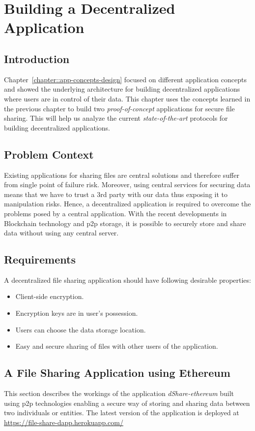 \chapter{Building a Decentralized Application}\label{chapter:building-dapp}

	\section{Introduction}
	Chapter~\ref{chapter::app-concepts-design} focused on different application concepts and showed the underlying architecture for building decentralized applications where users are in control of their data. This chapter uses the concepts learned in the previous chapter to build two \textit{proof-of-concept} applications for secure file sharing. This will help us analyze the current \textit{state-of-the-art} protocols for building decentralized applications.
	
	\section{Problem Context}
	Existing applications for sharing files are central solutions and therefore suffer from single point of failure risk. Moreover, using central services for securing data means that we have to trust a 3rd party with our data thus exposing it to manipulation risks. Hence, a decentralized application is required to overcome the problems posed by a central application. With the recent developments in Blockchain technology and p2p storage, it is possible to securely store and share data without using any central server.
	
	\section{Requirements}\label{sec:requirements}
	A decentralized file sharing application should have following desirable properties:
	\begin{itemize}
		\item Client-side encryption.
		\item Encryption keys are in user's possession.
		\item Users can choose the data storage location.
		\item Easy and secure sharing of files with other users of the application.
	\end{itemize}

	\section{A File Sharing Application using Ethereum}
	This section describes the workings of the application \textit{dShare-ethereum}\cite{harsh_kedia_2019_3359852} built using p2p technologies enabling a secure way of storing and sharing data between two individuals or entities. The latest version of the application is deployed at \url{https://file-share-dapp.herokuapp.com/}
	
